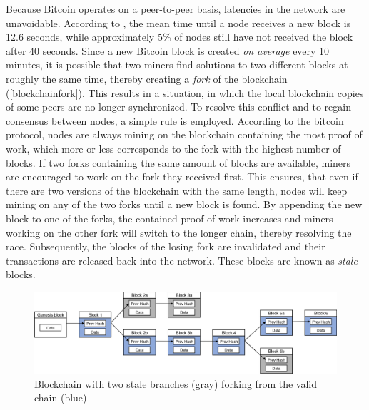 \documentclass[a4paper,12pt,twoside]{report}
\begin{document}
Because Bitcoin operates on a peer-to-peer basis, latencies in the network are unavoidable. According to \cite{infoprop}, the mean time until a
node receives a new block is 12.6 seconds, while approximately 5\% of nodes still have not received the block after 40 seconds. Since a new Bitcoin block is created \textit{on average} every 10 minutes, it is possible that two miners find solutions to two different blocks at roughly the same time, thereby creating a \textit{fork} of the blockchain (\autoref{blockchainfork}). This results in a situation, in which the local blockchain copies of some peers are no longer synchronized. To resolve this conflict and to regain consensus between nodes, a simple rule is employed. According to the bitcoin protocol, nodes are always mining on the blockchain containing the most proof of work, which more or less corresponds to the fork with the highest number of blocks. If two forks containing the same amount of blocks are available, miners are encouraged to work on the fork they received first. This ensures, that even if there are two versions of the blockchain with the same length, nodes will keep mining on any of the two forks until a new block is found. By appending the new block to one of the forks, the contained proof of work increases and miners working on the other fork will switch to the longer chain, thereby resolving the race. Subsequently, the blocks of the losing fork are invalidated and their transactions are released back into the network. These blocks are known as \textit{stale} blocks. \cite{okupski2014bitcoin}
\begin{figure}[ht]
	\centering
  \includegraphics[width=\textwidth]{BlockchainFork.png}
	\caption{Blockchain with two stale branches (gray) forking from the valid chain (blue) }
	\label{blockchainfork}
\end{figure}
\end{document}
